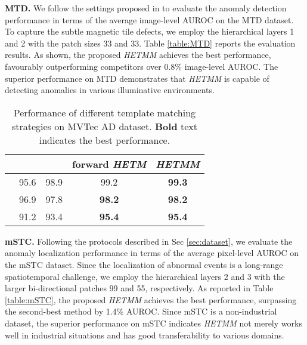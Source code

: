 \documentclass[default,iicol]{sn-jnl}\usepackage[algo2e,ruled,linesnumbered]{algorithm2e}
\theoremstyle{thmstyleone}\newtheorem{theorem}{Theorem}\newtheorem{proposition}[theorem]{Proposition}
\theoremstyle{thmstyletwo}\newtheorem{example}{Example}\newtheorem{remark}{Remark}
\theoremstyle{thmstylethree}\newtheorem{definition}{Definition}
\begin{document}
\noindent\textbf{MTD. }
We follow the settings proposed in \cite{DifferNet} to evaluate the anomaly detection performance in terms of the average image-level AUROC on the MTD dataset.
To capture the subtle magnetic tile defects, we employ the hierarchical layers 1 and 2 with the patch sizes 33 and 33.
Table \ref{table:MTD} reports the evaluation results.
As shown, the proposed \textit{HETMM} achieves the best performance, favourably outperforming competitors over 0.8\% image-level AUROC.
The superior performance on MTD demonstrates that \textit{HETMM} is capable of detecting anomalies in various illuminative environments.

\begin{table}[!t]
    \caption{
        Performance of different template matching strategies on MVTec AD dataset.
        \textbf{Bold} text indicates the best performance. 
    }
    \centering
    \label{table:RTMM}
    \begin{tabular}{c|cc|cc}
    \hline
                         &        &        &forward \textit{HETM}   &\textit{HETMM}\\\hline        
        &95.6            &98.9            &99.2           &\textbf{99.3}\\
        &96.9            &97.8            &\textbf{98.2}  &\textbf{98.2}\\
            &91.2            &93.4            &\textbf{95.4}           &\textbf{95.4}\\
    \hline
    \end{tabular}
\end{table}

\noindent\textbf{mSTC. }
Following the protocols described in Sec \ref{sec:dataset}, we evaluate the anomaly localization performance in terms of the average pixel-level AUROC on the mSTC dataset.
Since the localization of abnormal events is a long-range spatiotemporal challenge, we employ the hierarchical layers 2 and 3 with the larger bi-directional patches 99 and 55, respectively.
As reported in Table \ref{table:mSTC}, the proposed \textit{HETMM} achieves the best performance, surpassing the second-best method by 1.4\% AUROC.
Since mSTC is a non-industrial dataset, the superior performance on mSTC indicates \textit{HETMM} not merely works well in industrial situations and has good transferability to various domains.
\end{document}
